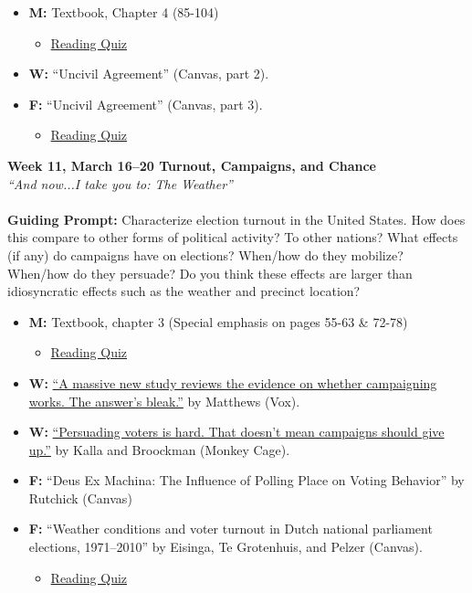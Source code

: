 \documentclass[11pt]{article}
\def\doubleq#1{``#1''}
\begin{document}
\begin{itemize}
\item \textbf{M:} Textbook, Chapter 4 (85-104)
\begin{itemize}
\item\underline{Reading Quiz}
\end{itemize}
\item \textbf{W:} \doubleq{Uncivil Agreement} (Canvas, part 2).
\item \textbf{F:} \doubleq{Uncivil Agreement} (Canvas, part 3).
\begin{itemize}
\item\underline{Reading Quiz}
\end{itemize}
\end{itemize}

\textbf{Week 11, March 16--20  Turnout, Campaigns, and Chance}
\\
\textit{\doubleq{And now...I take you to: The Weather}}
\\\\
\textbf{Guiding Prompt:} Characterize election turnout in the United States. How does this compare to other forms of political activity? To other nations? What effects (if any) do campaigns have on elections? When/how do they mobilize? When/how do they persuade? Do you think these effects are larger than idiosyncratic effects such as the weather and precinct location?   
\begin{itemize}
\item \textbf{M:} Textbook, chapter 3 (Special emphasis on pages 55-63 \& 72-78)
\begin{itemize}
\item\underline{Reading Quiz}
\end{itemize}
\item \textbf{W:} \href{https://www.vox.com/policy-and-politics/2017/9/28/16367580/campaigning-doesnt-work-general-election-study-kalla-broockman}{\doubleq{A massive new study reviews the evidence on whether campaigning works. The answer's bleak.}} by Matthews (Vox).
\item \textbf{W:} \href{https://www.washingtonpost.com/news/monkey-cage/wp/2017/10/11/our-research-shows-that-persuading-voters-is-hard-that-doesnt-mean-campaigns-should-give-up/}{\doubleq{Persuading voters is hard. That doesn't mean campaigns should give up.}} by Kalla and Broockman (Monkey Cage).
\item \textbf{F:} \doubleq{Deus Ex Machina: The Influence of Polling Place on Voting Behavior} by Rutchick (Canvas)
\item \textbf{F:} \doubleq{Weather conditions and voter turnout in Dutch national parliament elections, 1971–2010} by Eisinga, Te Grotenhuis, and Pelzer (Canvas).
\begin{itemize}
\item\underline{Reading Quiz}
\end{itemize}
\end{itemize}
\end{document}
